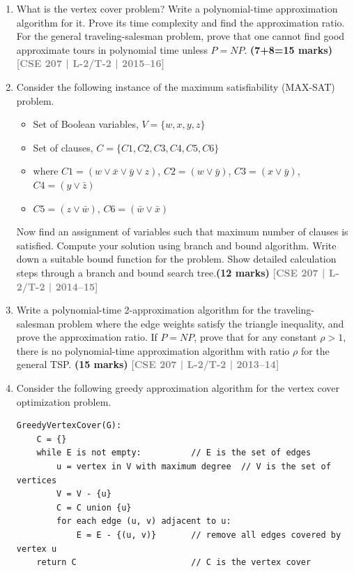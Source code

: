 \documentclass[12pt]{article}
\newcommand{\yr}[1]{\hfill\textcolor{gray}{\small\textbf{[#1]}}}
\newcommand{\mk}[1]{\textcolor{orange!70!black}{\small\textbf{(#1 marks)}}}
\begin{document}
\begin{enumerate}
\item What is the vertex cover problem? Write a polynomial-time approximation algorithm for it. Prove its time complexity and find the approximation ratio. For the general traveling-salesman problem, prove that one cannot find good approximate tours in polynomial time unless $P = NP$. \mk{7+8=15}
\yr{CSE 207 | L-2/T-2 | 2015--16}


\item Consider the following instance of the maximum satisfiability (MAX-SAT) problem.

\begin{itemize}
\item[] Set of Boolean variables, $V = \{w, x, y, z\}$
\item[] Set of clauses, $C = \{C1, C2, C3, C4, C5, C6\}$
\item[] where $C1 = (w \vee \bar{x} \vee \bar{y} \vee z)$, \quad
$C2 = (w \vee \bar{y})$, \quad
$C3 = (x \vee \bar{y})$, \quad
$C4 = (y \vee \bar{z})$
\item[] $C5 = (z \vee \bar{w})$, \quad
$C6 = (\bar{w} \vee \bar{x})$
\end{itemize}

\noindent
Now find an assignment of variables such that maximum number of clauses is satisfied.
Compute your solution using branch and bound algorithm. Write down a suitable bound
function for the problem. Show detailed calculation steps through a branch and bound
search tree.\mk{12}
\yr{CSE 207 | L-2/T-2 | 2014--15}


\item Write a polynomial-time 2-approximation algorithm for the traveling-salesman problem where the edge weights satisfy the triangle inequality, and prove the approximation ratio. If $P = NP$, prove that for any constant $\rho > 1$, there is no polynomial-time approximation algorithm with ratio $\rho$ for the general TSP. \mk{15}
\yr{CSE 207 | L-2/T-2 | 2013--14}


\item Consider the following greedy approximation algorithm for the vertex cover optimization problem.

\begin{lstlisting}
GreedyVertexCover(G):
    C = {}
    while E is not empty:          // E is the set of edges
        u = vertex in V with maximum degree  // V is the set of vertices
        V = V - {u}
        C = C union {u}
        for each edge (u, v) adjacent to u:
            E = E - {(u, v)}       // remove all edges covered by vertex u
    return C                       // C is the vertex cover
\end{lstlisting}


\end{enumerate}
\end{document}
